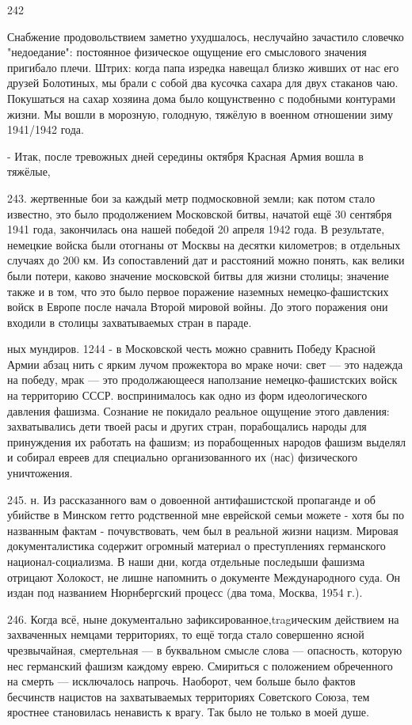 
242

Снабжение продовольствием заметно ухудшалось, неслучайно зачастило словечко "недоедание": постоянное физическое ощущение его смыслового значения пригибало плечи. Штрих: когда папа изредка навещал близко живших от нас его друзей Болотиных, мы брали с собой два кусочка сахара для двух стаканов чаю. Покушаться на сахар хозяина дома было кощунственно с подобными контурами жизни. Мы вошли в морозную, голодную, тяжёлую в военном отношении зиму 1941/1942 года.

- Итак, после тревожных дней середины октября Красная Армия вошла в тяжёлые,

243. жертвенные бои за каждый метр подмосковной земли; как потом стало известно, это было продолжением Московской битвы, начатой ещё 30 сентября 1941 года, закончилась она нашей победой 20 апреля 1942 года. В результате, немецкие войска были отогнаны от Москвы на десятки километров; в отдельных случаях до 200 км. Из сопоставлений дат и расстояний можно понять, как велики были потери, каково значение московской битвы для жизни столицы; значение также и в том, что это было первое поражение наземных немецко-фашистских войск в Европе после начала Второй мировой войны. До этого поражения они входили в столицы захватываемых стран в параде.

ных мундиров. 1244 - в Московской честь можно сравнить Победу Красной Армии абзац нить с ярким лучом прожектора во мраке ночи: свет — это надежда на победу, мрак — это продолжающееся наползание немецко-фашистских войск на территорию СССР. воспринималось как одно из форм идеологического давления фашизма. Сознание не покидало реальное ощущение этого давления: захватывались дети твоей расы и других стран, порабощались народы для принуждения их работать на фашизм; из порабощенных народов фашизм выделял и собирал евреев для специально организованного их (нас) физического уничтожения.

245. н.
Из рассказанного вам о довоенной антифашистской пропаганде и об убийстве в Минском гетто родственной мне еврейской семьи можете - хотя бы по названным фактам - почувствовать, чем был в реальной жизни нацизм. Мировая документалистика содержит огромный материал о преступлениях германского национал-социализма.
В наши дни, когда отдельные последыши фашизма отрицают Холокост, не лишне напомнить о документе Международного суда. Он издан под названием Нюрнбергский процесс (два тома, Москва, 1954 г.).

246.
Когда всё, ныне документально зафиксированное,tragическим действием на захваченных немцами территориях, то ещё тогда стало совершенно ясной чрезвычайная, смертельная — в буквальном смысле слова — опасность, которую нес германский фашизм каждому еврею.
Смириться с положением обреченного на смерть — исключалось напрочь. Наоборот, чем больше было фактов бесчинств нацистов на захватываемых территориях Советского Союза, тем яростнее становилась ненависть к врагу. Так было не только в моей душе.


